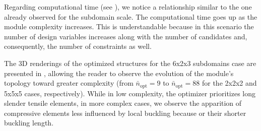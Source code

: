 Regarding computational time (see ), we notice a relationship similar to the one already observed for the subdomain scale. The computational time goes up as the module complexity increases. This is understandable because in this scenario the number of design variables increases along with the number of candidates and, consequently, the number of constraints as well.

The 3D renderings of the optimized structures for the 6x2x3 subdomains case are presented in , allowing the reader to observe the evolution of the module's topology toward greater complexity (from $\bar{n}_\text{opt}=9$ to $\bar{n}_\text{opt}=88$ for the 2x2x2 and 5x5x5 cases, respectively). While in low complexity, the optimizer prioritizes long slender tensile elements, in more complex cases, we observe the apparition of compressive elements less influenced by local buckling because or their shorter buckling length.



